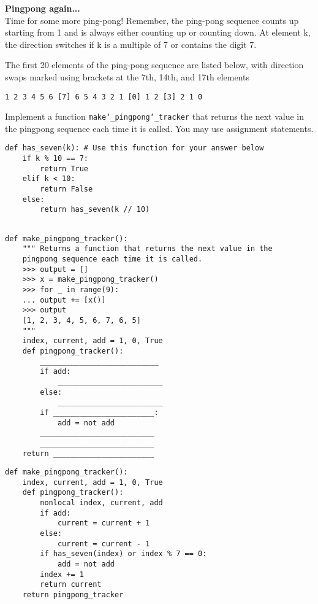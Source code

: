 \begin{blocksection}
\question \textbf{Pingpong again...}\\
Time for some more ping-pong!
Remember, the ping-pong sequence counts up starting from 1 and is
always either counting up or counting down. At element k, the direction switches if k is a multiple of 7 or contains the
digit 7.

The first 20 elements of the ping-pong sequence are listed below, with direction
swaps marked using brackets at the 7th, 14th, and 17th elements
\begin{lstlisting}
1 2 3 4 5 6 [7] 6 5 4 3 2 1 [0] 1 2 [3] 2 1 0
\end{lstlisting}

Implement a function \texttt{make\char`_pingpong\char`_tracker} that returns the
next value in the pingpong sequence each time it is called. You may use assignment statements.
\newline

\begin{lstlisting}
def has_seven(k): # Use this function for your answer below
    if k % 10 == 7:
        return True
    elif k < 10:
        return False
    else:
        return has_seven(k // 10)
\end{lstlisting}

\begin{lstlisting}

def make_pingpong_tracker():
    """ Returns a function that returns the next value in the
    pingpong sequence each time it is called.
    >>> output = []
    >>> x = make_pingpong_tracker()
    >>> for _ in range(9):
    ... output += [x()]
    >>> output
    [1, 2, 3, 4, 5, 6, 7, 6, 5]
    """
    index, current, add = 1, 0, True
    def pingpong_tracker():
        ___________________________
        if add:
            ________________________
        else:
            ________________________
        if _______________________:
            add = not add
        __________________________
        __________________________
    return _______________________
\end{lstlisting}
\end{blocksection}

\begin{solution}
\begin{blocksection}
\begin{lstlisting}
def make_pingpong_tracker():
    index, current, add = 1, 0, True
    def pingpong_tracker():
        nonlocal index, current, add
        if add:
            current = current + 1
        else:
            current = current - 1
        if has_seven(index) or index % 7 == 0:
            add = not add
        index += 1
        return current
    return pingpong_tracker
\end{lstlisting}
\end{blocksection}
\end{solution}

